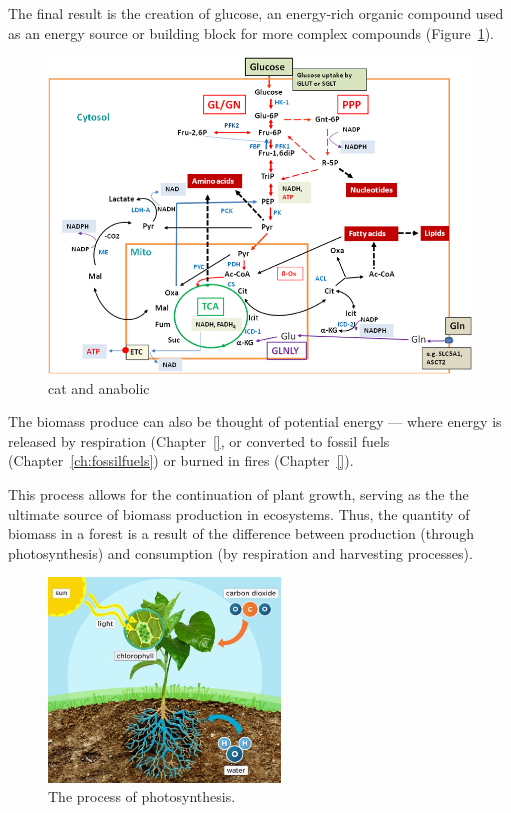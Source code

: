 The final result is the creation of glucose, an energy-rich organic compound used as an energy source or building block for more complex compounds (Figure~\ref{fig:Major-catabolic-and-anabolic-pathways-in-mammalian}). 
  
\begin{figure}
	\centering
		\includegraphics{graphics/Major-catabolic-and-anabolic-pathways-in-mammalian.png}
	\caption{cat and anabolic}
	\label{fig:Major-catabolic-and-anabolic-pathways-in-mammalian}
\end{figure}

    
The biomass produce can also be thought of potential energy --- where energy is released by respiration (Chapter~\ref{}, or converted to fossil fuels (Chapter~\ref{ch:fossilfuels}) or burned in fires (Chapter~\ref{}). 

This process allows for the continuation of plant growth, serving as the the ultimate source of biomass production in ecosystems. Thus, the quantity of biomass in a forest is a result of the difference between production (through photosynthesis) and consumption (by respiration and harvesting processes).

  \begin{figure}[ht]
    \centering
        \includegraphics[width = 0.55\textwidth]{graphics/photosynthesis.jpg}
        \caption{The process of photosynthesis.}
    \end{figure}
    

